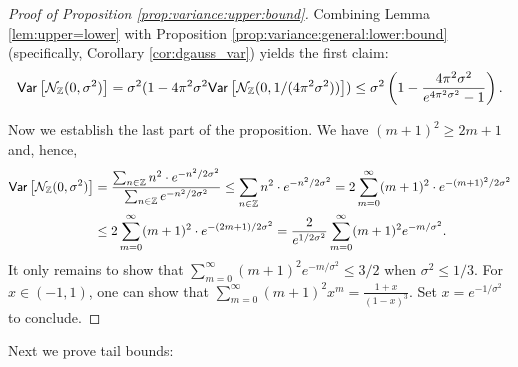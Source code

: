 \documentclass{jpc}
\newcommand{\var}[2]{{\ifx&#1& \mathsf{Var} \else
\underset{#1}{\mathsf{Var}} \fi \left[#2\right]}}
\newcommand{\Z}{\mathbb{Z}}
\begin{document}
\begin{proof}[Proof of Proposition \ref{prop:variance:upper:bound}]
Combining Lemma \ref{lem:upper=lower} with Proposition \ref{prop:variance:general:lower:bound} (specifically, Corollary \ref{cor:dgauss_var}) yields the first claim:
\[
\var{}{\discN(0,\sigma^2)} = \sigma^2 (1 - 4\pi^2\sigma^2\var{}{\discN(0,1/(4\pi^2\sigma^2))} ) \leq \sigma^2 \left(1 - \frac{4\pi^2\sigma^2}{e^{4\pi^2\sigma^2}-1} \right).
\]

Now we establish the last part of the proposition. We have $(m+1)^2\ge 2m+1$ and, hence,
\begin{align*}
    \var{}{\discN(0,\sigma^2)} &= \frac{\sum_{n \in \Z} n^2 \cdot e^{-n^2/2\sigma^2}}{\sum_{n \in \Z} e^{-n^2/2\sigma^2}} \le \sum_{n \in \Z} n^2 \cdot e^{-n^2/2\sigma^2} = 2\sum_{m=0}^\infty (m+1)^2 \cdot e^{-(m+1)^2/2\sigma^2}\\
    &\le 2\sum_{m=0}^\infty (m+1)^2 \cdot e^{-(2m+1)/2\sigma^2} = \frac{2}{e^{1/2\sigma^2}} \sum_{m=0}^\infty (m+1)^2 e^{-m/\sigma^2}.
\end{align*}
It only remains to show that $\sum_{m=0}^\infty (m+1)^2 e^{-m/\sigma^2} \leq 3/2$ when $\sigma^2\le1/3$. For $x \in (-1,1)$, one can show that $\sum_{m=0}^\infty (m+1)^2 x^{m} = \frac{1+x}{(1-x)^3}$. Set $x=e^{-1/\sigma^2}$ to conclude.
\end{proof}

Next we prove tail bounds:
\end{document}

